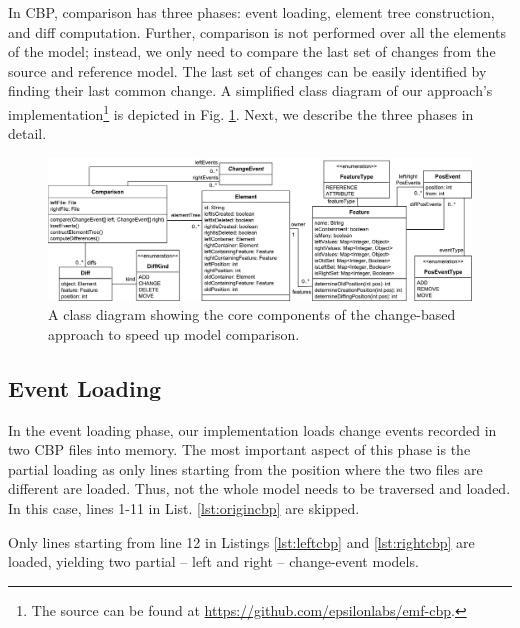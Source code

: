 \documentclass{jot}
\begin{document}
In CBP, comparison has three phases: event loading, element tree construction, and diff computation.
Further, comparison is not performed over all the elements of the model; instead, we only need to compare the last set of changes from the source and reference model.
The last set of changes can be easily identified by finding their last common change.
A simplified class diagram of our approach's implementation\footnote{The source can be found at \url{https://github.com/epsilonlabs/emf-cbp}.} is depicted in Fig. \ref{fig:approach_class_diagram}. 
Next, we describe the three phases in detail.

\begin{figure}
    \includegraphics[width=\linewidth]{TreeClassDiagram}
    \caption{A class diagram showing the core components of the change-based approach to speed up model comparison.}
    \label{fig:approach_class_diagram}
\end{figure}


\subsection{Event Loading}
\label{sec:event_loading}
In the event loading phase, our implementation loads change events recorded in two CBP files into memory.
The most important aspect of this phase is the partial loading as only lines starting from the position where the two files are different are loaded.
Thus, not the whole model needs to be traversed and loaded.
In this case, lines 1-11 in List. \ref{lst:origincbp} are skipped.

Only lines starting from line 12 in Listings \ref{lst:leftcbp} and \ref{lst:rightcbp} are loaded, yielding two partial -- left and right -- change-event models. 
\end{document}
